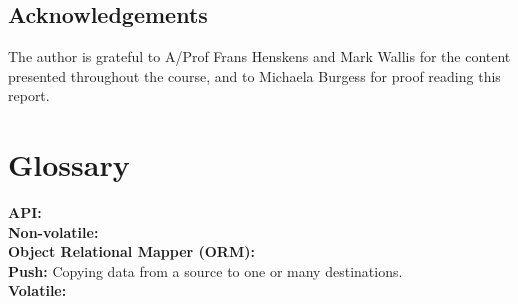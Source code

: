\documentclass[a4,12pt]{article}
\begin{document}
\subsection*{Acknowledgements}
The author is grateful to A/Prof Frans Henskens and Mark Wallis for the content presented throughout the course, and to Michaela Burgess for proof reading this report.
\newpage
\section{Glossary}
\textbf{API:}
\\\textbf{Non-volatile:}
\\\textbf{Object Relational Mapper (ORM):} 
\\\textbf{Push:} Copying data from a source to one or many destinations. 
\\\textbf{Volatile:}
%

\vskip 0.2in
\newpage


\end{document}
